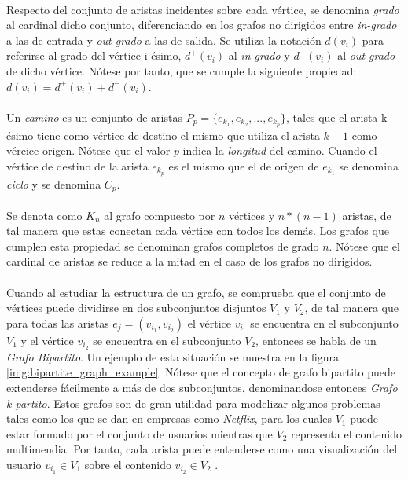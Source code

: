 \documentclass{subfiles}
\begin{document}
      \paragraph{}
      Respecto del conjunto de aristas incidentes sobre cada vértice, se denomina \emph{grado} al cardinal dicho conjunto, diferenciando en los grafos no dirigidos entre \emph{in-grado} a las de entrada y \emph{out-grado} a las de salida. Se utiliza la notación $d(v_i)$ para referirse al grado del vértice i-ésimo, $d^+(v_i)$ al \emph{in-grado} y $d^-(v_i)$ al \emph{out-grado} de dicho vértice. Nótese por tanto, que se cumple la siguiente propiedad: $d(v_i) = d^+(v_i) + d^-(v_i)$.


      \paragraph{}
      Un \emph{camino} es un conjunto de aristas $P_p = \{ e_{k_1}, e_{k_2}, ..., e_{k_p}\}$, tales que el arista k-ésimo tiene como vértice de destino el mísmo que utiliza el arista $k+1$ como vércice origen. Nótese que el valor $p$ indica la \emph{longitud} del camino. Cuando el vértice de destino de la arista $e_{k_p}$ es el mismo que el de origen de $e_{k_1}$ se denomina \emph{ciclo} y se denomina $C_p$.

      \paragraph{}
      Se denota como $K_n$ al grafo compuesto por $n$ vértices y $n*(n-1)$ aristas, de tal manera que estas conectan cada vértice con todos los demás. Los grafos que cumplen esta propiedad se denominan grafos completos de grado $n$. Nótese que el cardinal de aristas se reduce a la mitad en el caso de los grafos no dirigidos.

      \paragraph{}
      Cuando al estudiar la estructura de un grafo, se comprueba que el conjunto de vértices puede dividirse en dos subconjuntos disjuntos $V_1$ y $V_2$, de tal manera que para todas las aristas $e_j = (v_{i_1}, v_{i_2})$ el vértice $v_{i_1}$ se encuentra en el subconjunto $V_1$ y el vértice $v_{i_2}$ se encuentra en el subconjunto $V_2$, entonces se habla de un \emph{Grafo Bipartito}. Un ejemplo de esta situación se muestra en la figura \ref{img:bipartite_graph_example}. Nótese que el concepto de grafo bipartito puede extenderse fácilmente a más de dos subconjuntos, denominandose entonces \emph{Grafo k-partito}. Estos grafos son de gran utilidad para modelizar algunos problemas tales como los que se dan en empresas como \emph{Netflix}, para los cuales $V_1$ puede estar formado por el conjunto de usuarios mientras que $V_2$ representa el contenido multimendia. Por tanto, cada arista puede entenderse como una visualización del usuario $v_{i_1} \in V_1$ sobre el contenido $v_{i_2} \in V_2$ .
\end{document}
